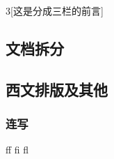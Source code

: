{    \onecolumn

    \begin{multicols}{3}[\centering 这是分成三栏的前言] 
            \blindtext
            \the\columnwidth

            \columnbreak

            \blindtext
            \the\columnwidth

            \newpage

            \blindtext
            \the\columnwidth
    \end{multicols}

    \blindtext

    \clearpage 
        } 

    \subsection{文档拆分}

    \subsection{西文排版及其他}
        \subsubsection{连写}
            ff fi fl %

